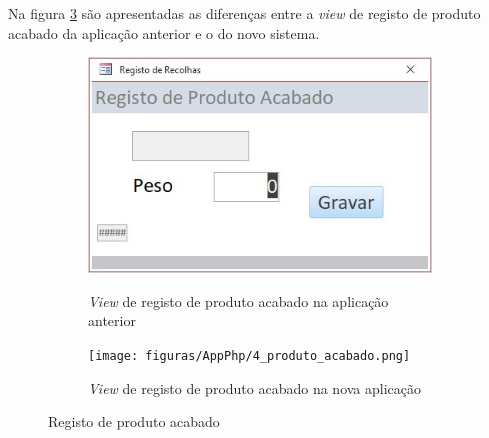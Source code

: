 Na figura \ref{fig:comparacao_prodacabado} são apresentadas as diferenças entre a \textit{view} de registo de produto acabado da aplicação anterior e o do novo sistema.
\begin{figure}[H]
	\centering
	
	\begin{subfigure}[t]{0.35\linewidth}
		\includegraphics[width=\linewidth]{figuras/AppAccess/4-ProdutoAcabado.jpg}
		\label{fig:comparacao_prodacabado_1}
		\caption{\textit{View} de registo de produto acabado na aplicação anterior}
	\end{subfigure}
	\begin{subfigure}[t]{0.55\linewidth}
		\texttt{[image: figuras/AppPhp/4\_produto\_acabado.png]}
		\label{fig:comparacao_prodacabado_2}
		\caption{\textit{View} de registo de produto acabado na nova aplicação}
	\end{subfigure}
	
	\caption{Registo de produto acabado}
	\label{fig:comparacao_prodacabado}
\end{figure}

